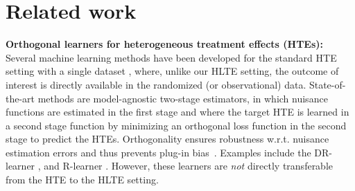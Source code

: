\documentclass{article}
\theoremstyle{plain}
\theoremstyle{definition}
\theoremstyle{remark}
\newcommand{\1}{\mathds{1}}                %
\newcommand{\TODO}[1]{\textcolor{lightred}{#1}}
\begin{document}

\vspace{-0.2cm}

\section{Related work}
\label{sec:related_work}



\textbf{Orthogonal learners for heterogeneous treatment effects (HTEs):} Several machine learning methods have been developed for the standard HTE setting with a single dataset \citep[e.g.,][]{Shalit.2017, Curth.2021}, where, unlike our HLTE setting, the outcome of interest is directly available in the randomized (or observational) data. State-of-the-art methods are model-agnostic two-stage estimators, in which nuisance functions are estimated in the first stage and where the target HTE is learned in a second stage function by minimizing an orthogonal loss function \cite{Foster.2023} in the second stage to predict the HTEs. Orthogonality ensures robustness w.r.t. nuisance estimation errors \cite{Chernozhukov.2018} and thus prevents plug-in bias~\cite{Kennedy.2022-Sempiparametric}.
Examples include the DR-learner \cite{Kennedy.2020-DR-learner}, and R-learner \cite{Nie.2021}. However, these learners are \textit{not} directly transferable from the HTE to the HLTE setting. 


\end{document}
